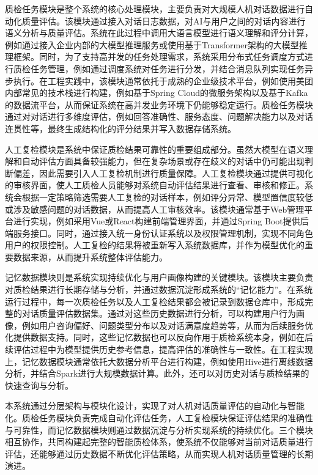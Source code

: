 质检任务模块是整个系统的核心处理模块，主要负责对大规模人机对话数据进行自动化质量评估。该模块通过接入对话日志数据，对AI与用户之间的对话内容进行语义分析与质量评估。系统在此过程中调用大语言模型进行语义理解和评分计算，例如通过接入企业内部的大模型推理服务或使用基于Transformer架构的大模型推理框架。同时，为了支持高并发的任务处理需求，系统采用分布式任务调度方式进行质检任务管理，例如通过调度系统对任务进行分发，并结合消息队列实现任务异步执行。在工程实践中，该模块通常依托于成熟的企业级技术平台，例如使用美团内部常见的技术栈进行构建，例如基于Spring Cloud的微服务架构以及基于Kafka的数据流平台，从而保证系统在高并发业务环境下仍能够稳定运行。质检任务模块通过对对话进行多维度评估，例如回答准确性、服务态度、问题解决能力以及对话连贯性等，最终生成结构化的评分结果并写入数据存储系统。

人工复检模块是系统中保证质检结果可靠性的重要组成部分。虽然大模型在语义理解和自动评估方面具备较强能力，但在复杂场景或存在歧义的对话中仍可能出现判断偏差，因此需要引入人工复检机制进行质量保障。人工复检模块通过提供可视化的审核界面，使人工质检人员能够对系统自动评估结果进行查看、审核和修正。系统会根据一定策略筛选需要人工复检的对话样本，例如评分异常、模型置信度较低或涉及敏感问题的对话数据，从而提高人工审核效率。该模块通常基于Web管理平台进行实现，例如采用Vue或React构建前端管理界面，并通过Spring Boot提供后端服务接口。同时，通过接入统一身份认证系统以及权限管理机制，实现不同角色用户的权限控制。人工复检的结果将被重新写入系统数据库，并作为模型优化的重要数据来源，从而提升系统整体评估能力。

记忆数据模块则是系统实现持续优化与用户画像构建的关键模块。该模块主要负责对质检结果进行长期存储与分析，并通过数据沉淀形成系统的“记忆能力”。在系统运行过程中，每一次质检任务以及人工复检结果都会被记录到数据仓库中，形成完整的对话质量评估数据集。通过对这些历史数据进行分析，可以构建用户行为画像，例如用户咨询偏好、问题类型分布以及对话满意度趋势等，从而为后续服务优化提供数据支持。同时，这些记忆数据也可以反向作用于质检系统本身，例如在后续评估过程中为模型提供历史参考信息，提高评估的准确性与一致性。在工程实现上，记忆数据模块通常依托大数据分析平台进行构建，例如使用Hive进行离线数据分析，并结合Spark进行大规模数据计算。此外，还可以对历史对话与质检结果的快速查询与分析。

本系统通过分层架构与模块化设计，实现了对人机对话质量评估的自动化与智能化。质检任务模块负责完成自动化评估任务，人工复检模块保证评估结果的准确性与可靠性，而记忆数据模块则通过数据沉淀与分析实现系统的持续优化。三个模块相互协作，共同构建起完整的智能质检体系，使系统不仅能够对当前对话质量进行评估，还能够通过历史数据不断优化评估策略，从而实现人机对话质量管理的长期演进。
